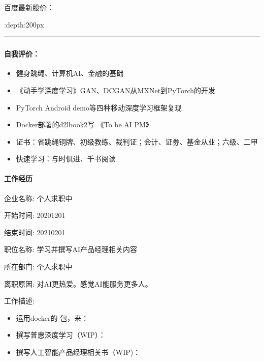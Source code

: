 \documentclass[letterpaper,11pt,english]{sphinxmanual}
\begin{document}
百度最新股价：

\begin{center}\end{center} :depth:200px


\bigskip\hrule\bigskip




\subsubsection{}
\label{\detokenize{get_started:id1}}

\paragraph{自我评价：}
\label{\detokenize{get_started:id2}}\begin{itemize}
\item {} 
健身跳绳、计算机AI、金融的基础

\item {} 
《动手学深度学习》GAN、DCGAN从MXNet到PyTorch的开发

\item {} 
PyTorch Android demo等四种移动深度学习框架复现

\item {} 
Docker部署的d2lbook2写 《To be AI PM》

\item {} 
证书：省跳绳铜牌、初级教练、裁判证；会计、证券、基金从业；六级、二甲

\item {} 
快速学习：与时俱进、千书阅读

\end{itemize}


\paragraph{工作经历}
\label{\detokenize{get_started:id3}}
企业名称: 个人求职中

开始时间: 2020\sphinxhyphen{}12\sphinxhyphen{}01

结束时间: 2021\sphinxhyphen{}02\sphinxhyphen{}01

职位名称: 学习并撰写AI产品经理相关内容

所在部门: 个人求职中

离职原因: 对AI更热爱。感觉AI能服务更多人。

工作描述:
\begin{itemize}
\item {} 
运用docker的  包，来：

\item {} 
撰写普惠深度学习（WIP）：

\item {} 
撰写人工智能产品经理相关书（WIP)：

\end{itemize}
\end{document}
